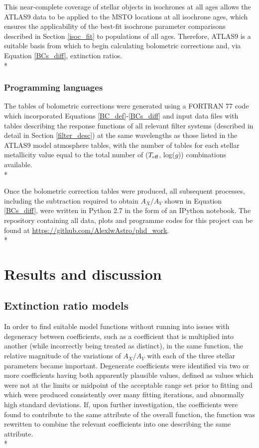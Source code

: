 \documentclass[12pt, a4paper]{report}
\begin{document}
This near-complete coverage of stellar objects in isochrones at all ages allows the ATLAS9 data to be applied to the MSTO locations at all isochrone ages, which ensures the applicability of the best-fit isochrone parameter comparisons described in Section \ref{isoc_fit} to populations of all ages. Therefore, ATLAS9 is a suitable basis from which to begin calculating bolometric corrections and, via Equation \ref{BCs_diff}, extinction ratios. \\*



\subsection{Programming languages}
The tables of bolometric corrections were generated using a FORTRAN 77 code which incorporated Equations \ref{BC_def}-\ref{BCs_diff} and input data files with tables describing the response functions of all relevant filter systems (described in detail in Section \ref{filter_desc}) at the same wavelengths as those listed in the ATLAS9 model atmosphere tables, with the number of tables for each stellar metallicity value equal to the total number of ($T_{\textnormal{eff}}$, log($g$)) combinations available.\\*

Once the bolometric correction tables were produced, all subsequent processes, including the subtraction required to obtain $A_{X}/A_{V}$ shown in Equation \ref{BCs_diff}, were written in Python 2.7 in the form of an IPython notebook. The repository containing all data, plots and programme codes for this project can be found at \protect\url{https://github.com/AlexlwAstro/phd_work}.\\*



\chapter{Results and discussion}
\section{Extinction ratio models} \label{ext_models}

In order to find suitable model functions without running into issues with degeneracy between coefficients, such as a coefficient that is multiplied into another (while incorrectly being treated as distinct), in the same function, the relative magnitude of the variations of $A_{X}/A_{V}$ with each of the three stellar parameters became important. Degenerate coefficients were identified via two or more coefficients having both apparently plausible values, defined as values which were not at the limits or midpoint of the acceptable range set prior to fitting and which were produced consistently over many fitting iterations, and abnormally high standard deviations. If, upon further investigation, the coefficients were found to contribute to the same attribute of the overall function, the function was rewritten to combine the relevant coefficients into one describing the same attribute.\\*
\end{document}
